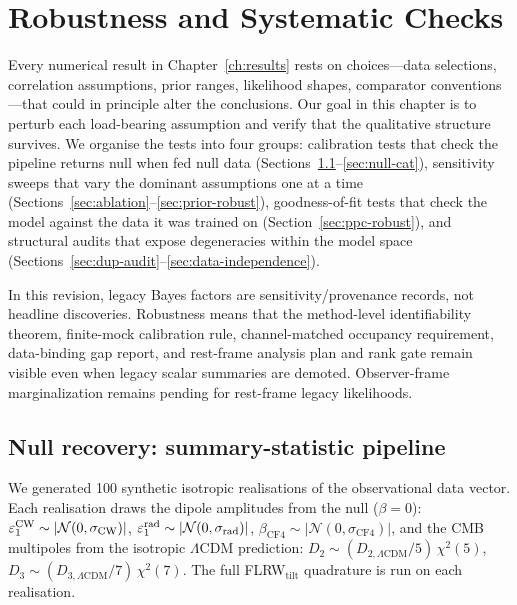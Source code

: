 
\chapter{Robustness and Systematic Checks}\label{ch:robustness}

Every numerical result in Chapter~\ref{ch:results} rests on
choices---data selections, correlation assumptions, prior
ranges, likelihood shapes, comparator conventions---that could
in principle alter the conclusions.  Our goal in this chapter is
to perturb each load-bearing assumption and verify that the
qualitative structure survives.  We organise the tests into four
groups: calibration tests that check the pipeline returns null
when fed null data (Sections~\ref{sec:null-ss}--\ref{sec:null-cat}),
sensitivity sweeps that vary the dominant assumptions one at a
time (Sections~\ref{sec:ablation}--\ref{sec:prior-robust}),
goodness-of-fit tests that check the model against the data it
was trained on (Section~\ref{sec:ppc-robust}), and structural
audits that expose degeneracies within the model space
(Sections~\ref{sec:dup-audit}--\ref{sec:data-independence}).

In this revision, legacy Bayes factors are
sensitivity/provenance records, not headline discoveries.
Robustness means that the method-level identifiability theorem,
finite-mock calibration rule, channel-matched occupancy
requirement, data-binding gap report, and rest-frame analysis
plan and rank gate remain visible even when legacy scalar
summaries are demoted.  Observer-frame marginalization remains
pending for rest-frame legacy likelihoods.


\section{Null recovery: summary-statistic pipeline}
\label{sec:null-ss}

We generated 100 synthetic isotropic realisations of the
observational data vector.  Each realisation draws the
dipole amplitudes from the null ($\beta = 0$):
$\varepsilon_1^{\mathrm{CW}} \sim |\mathcal{N}(0, \sigma_{\mathrm{CW}})|$,
$\varepsilon_1^{\mathrm{rad}} \sim |\mathcal{N}(0, \sigma_{\mathrm{rad}})|$,
$\beta_{\mathrm{CF4}} \sim |\mathcal{N}(0, \sigma_{\mathrm{CF4}})|$,
and the CMB multipoles from the isotropic $\Lambda$CDM prediction:
$D_2 \sim (D_{2,\Lambda\mathrm{CDM}}/5)\,\chi^2(5)$,
$D_3 \sim (D_{3,\Lambda\mathrm{CDM}}/7)\,\chi^2(7)$.
The full FLRW$_\mathrm{tilt}$ quadrature is run on each realisation.

